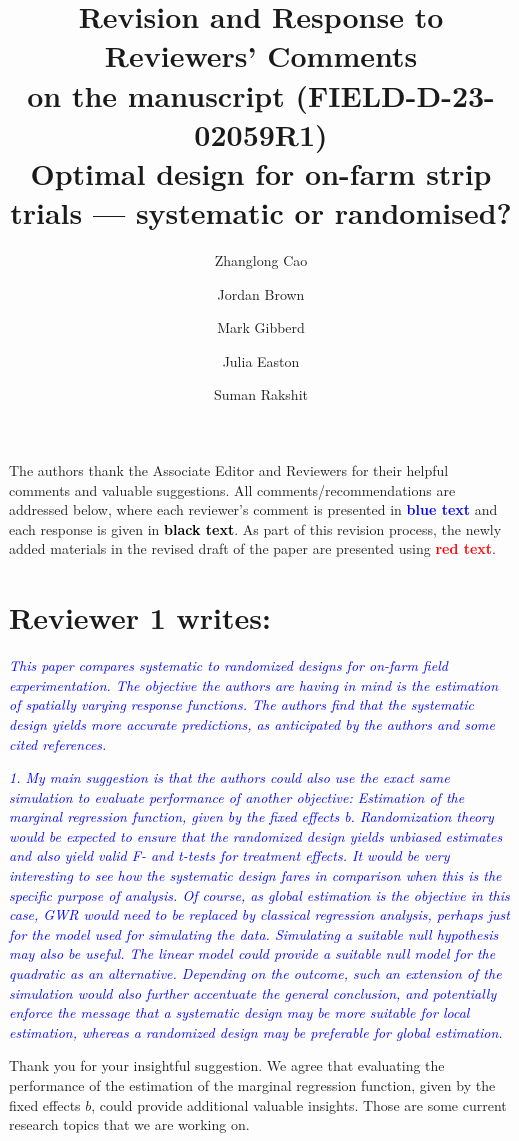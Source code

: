 \documentclass[a4paper]{article}   	%
\title{Revision and Response to Reviewers' Comments \\ 
\large on the manuscript (FIELD-D-23-02059R1) \\ Optimal design for on-farm strip trials --- systematic or randomised?}
\author[1,*]{Zhanglong Cao}
\author[1]{Jordan Brown}
\author[1]{Mark Gibberd}
\author[1]{Julia Easton}
\author[1,2]{Suman Rakshit}
\affil[1]{Curtin Biometry and Agricultural Data Analytics, Centre for Crop and Disease Management, Curtin University, Perth, Australia}
\affil[2]{School of Electrical Engineering, Computing and Mathematical Sciences, Curtin University, Perth, Australia}
\affil[*]{Corresponding author: Zhanglong Cao, zhanglong.cao@curtin.edu.au}
\date{}
\newcommand{\revision}[1]{\textcolor{red}{#1}}
\newcommand{\reviewer}[1]{\textcolor{blue}{\textit{#1}}}
\begin{document}
\linenumbers

\maketitle

The authors thank the Associate Editor and Reviewers for their helpful comments and valuable suggestions. All comments/recommendations are addressed below, where each reviewer's comment is presented in \textcolor{blue}{\textbf{blue text}} and each response is given in \textcolor{black}{\textbf{black text}}. As part of this revision process, the newly added materials in the revised draft of the paper are presented using \revision{\textbf{red text}}.




\section*{Reviewer 1 writes:}

\reviewer{This paper compares systematic to randomized designs for on-farm field experimentation. The objective the authors are having in mind is the estimation of spatially varying response functions. The authors find that the systematic design yields more accurate predictions, as anticipated by the authors and some cited references.}

\reviewer{1. My main suggestion is that the authors could also use the exact same simulation to evaluate performance of another objective: Estimation of the marginal regression function, given by the fixed effects b. Randomization theory would be expected to ensure that the randomized design yields unbiased estimates and also yield valid F- and t-tests for treatment effects. It would be very interesting to see how the systematic design fares in comparison when this is the specific purpose of analysis. Of course, as global estimation is the objective in this case, GWR would need to be replaced by classical regression analysis, perhaps just for the model used for simulating the data. Simulating a suitable null hypothesis may also be useful. The linear model could provide a suitable null model for the quadratic as an alternative. Depending on the outcome, such an extension of the simulation would also further accentuate the general conclusion, and potentially enforce the message that a systematic design may be more suitable for local estimation, whereas a randomized design may be preferable for global estimation.}


Thank you for your insightful suggestion. We agree that evaluating the performance of the estimation of the marginal regression function, given by the fixed effects $b$, could provide additional valuable insights. Those are some current research topics that we are working on.  
\end{document}
